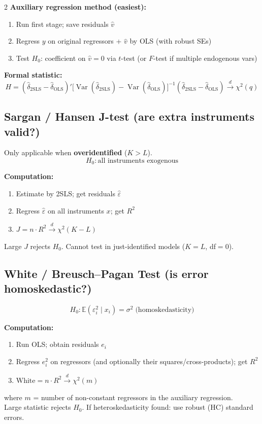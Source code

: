 \documentclass[9pt,a4paper]{article}
\newcommand{\Var}{\operatorname{Var}}
\newcommand{\E}{\mathbb{E}}
\begin{document}
\begin{multicols}{2}
\textbf{Auxiliary regression method (easiest):}
\begin{enumerate}[noitemsep,topsep=0pt,leftmargin=*]
  \item Run first stage; save residuals $\hat{v}$
  \item Regress $y$ on original regressors + $\hat{v}$ by OLS (with robust SEs)
  \item Test $H_0$: coefficient on $\hat{v}=0$ via $t$-test (or $F$-test if multiple endogenous vars)
\end{enumerate}

\textbf{Formal statistic:}
\[
  H = (\hat\delta_\text{2SLS}-\hat\delta_\text{OLS})'\bigl[\Var(\hat\delta_\text{2SLS})-\Var(\hat\delta_\text{OLS})\bigr]^{-1}(\hat\delta_\text{2SLS}-\hat\delta_\text{OLS}) \xrightarrow{d}\chi^2(q)
\]

\subsection*{Sargan / Hansen J-test (are extra instruments valid?)}
Only applicable when \textbf{overidentified} ($K>L$).
\[
  H_0\colon \text{all instruments exogenous}
\]

\textbf{Computation:}
\begin{enumerate}[noitemsep,topsep=0pt,leftmargin=*]
  \item Estimate by 2SLS; get residuals $\hat\varepsilon$
  \item Regress $\hat\varepsilon$ on all instruments $x$; get $R^2$
  \item $J = n\cdot R^2 \xrightarrow{d}\chi^2(K-L)$
\end{enumerate}
Large $J$ rejects $H_0$. Cannot test in just-identified models ($K=L$, df$=0$).

\subsection*{White / Breusch--Pagan Test (is error homoskedastic?)}
\[
  H_0\colon \E(\varepsilon_i^2 \mid x_i) = \sigma^2 \;\text{(homoskedasticity)}
\]

\textbf{Computation:}
\begin{enumerate}[noitemsep,topsep=0pt,leftmargin=*]
  \item Run OLS; obtain residuals $e_i$
  \item Regress $e_i^2$ on regressors (and optionally their squares/cross-products); get $R^2$
  \item $\text{White} = n \cdot R^2 \xrightarrow{d} \chi^2(m)$
\end{enumerate}
where $m$ = number of non-constant regressors in the auxiliary regression.\\
Large statistic rejects $H_0$. If heteroskedasticity found: use robust (HC) standard errors.


\end{multicols}
\end{document}
